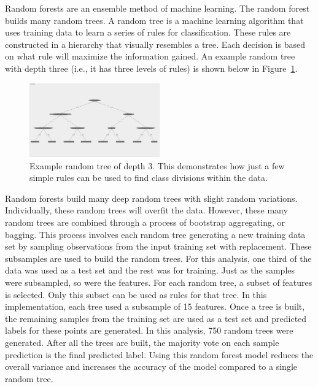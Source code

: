 \documentclass{article}
\begin{document}
Random forests are an ensemble method of machine learning.  The random forest builds many random trees.  A random tree is a machine learning algorithm that uses training data to learn a series of rules for classification.  These rules are constructed in a hierarchy that visually resembles a tree.  Each decision is based on what rule will maximize the information gained.  An example random tree with depth three (i.e., it has three levels of rules) is shown below in Figure~\ref{fig:ex_tree}.
\begin{figure}[H]
    \centering
        \includegraphics[width=0.5\textwidth]{3_level_tree}
        \caption{Example random tree of depth 3.  This demonstrates how just a few simple rules can be used to find class divisions within the data.}
        \label{fig:ex_tree}
\end{figure}

Random forests build many deep random trees with slight random variations.  Individually, these random trees will overfit the data.  However, these many random trees are combined through a process of bootstrap aggregating, or bagging.  This process involves each random tree generating a new training data set by sampling observations from the input training set with replacement.  These subsamples are used to build the random trees.  For this analysis, one third of the data was used as a test set and the rest was for training.  Just as the samples were subsampled, so were the features.  For each random tree, a subset of features is selected.  Only this subset can be used as rules for that tree.  In this implementation, each tree used a subsample of 15 features. Once a tree is built, the remaining samples from the training set are used as a test set and predicted labels for these points are generated. In this analysis, 750 random trees were generated. After all the trees are built, the majority vote on each sample prediction is the final predicted label.  Using this random forest model reduces the overall variance and increases the accuracy of the model compared to a single random tree.
\end{document}
